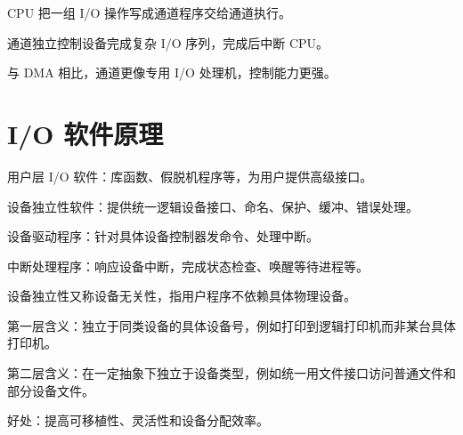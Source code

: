 \begin{points}
  \item CPU 把一组 I/O 操作写成通道程序交给通道执行。
  \item 通道独立控制设备完成复杂 I/O 序列，完成后中断 CPU。
  \item 与 DMA 相比，通道更像专用 I/O 处理机，控制能力更强。
\end{points}


\section{I/O 软件原理}
\begin{points}
  \item 用户层 I/O 软件：库函数、假脱机程序等，为用户提供高级接口。
  \item 设备独立性软件：提供统一逻辑设备接口、命名、保护、缓冲、错误处理。
  \item 设备驱动程序：针对具体设备控制器发命令、处理中断。
  \item 中断处理程序：响应设备中断，完成状态检查、唤醒等待进程等。
\end{points}


\begin{points}
  \item 设备独立性又称设备无关性，指用户程序不依赖具体物理设备。
  \item 第一层含义：独立于同类设备的具体设备号，例如打印到逻辑打印机而非某台具体打印机。
  \item 第二层含义：在一定抽象下独立于设备类型，例如统一用文件接口访问普通文件和部分设备文件。
  \item 好处：提高可移植性、灵活性和设备分配效率。
\end{points}


